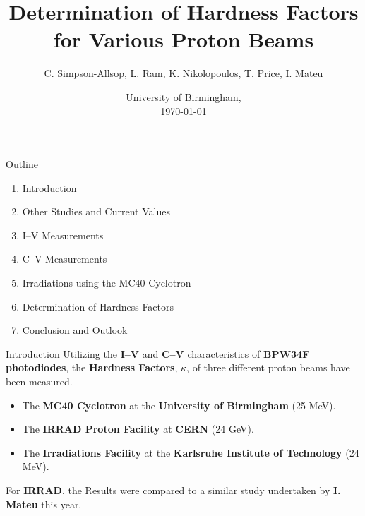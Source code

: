 \documentclass{beamer}
\title{Determination of Hardness Factors for Various Proton Beams}
\author{C. Simpson-Allsop, L. Ram, K. Nikolopoulos, T. Price, I. Mateu \vspace{-1cm}}
\date{University of Birmingham, \\ \vspace{0.1cm} \today}
\begin{document}
\begin{frame}
  \titlepage
\end{frame}

\begin{frame}{Outline}
    \begin{enumerate}
        \item Introduction
        \vspace{0.5cm}
        \item Other Studies and Current Values
        \vspace{0.5cm}
        \item I--V Measurements
        \vspace{0.5cm}
        \item C--V Measurements
        \vspace{0.5cm}
        \item Irradiations using the MC40 Cyclotron
        \vspace{0.5cm}
        \item Determination of Hardness Factors
        \vspace{0.5cm}
        \item Conclusion and Outlook
    \end{enumerate}
\end{frame}

\begin{frame}{Introduction}
 Utilizing the \textbf{I--V} and \textbf{C--V} characteristics of \textbf{BPW34F photodiodes}, the \textbf{Hardness Factors}, $\kappa$, of three different proton beams have been measured.
  \vspace{0.3cm}
  \begin{itemize}
  \item The \textbf{MC40 Cyclotron} at the \textbf{University of Birmingham} (25 MeV).
  \vspace{0.1cm}
  \item The \textbf{IRRAD Proton Facility} at \textbf{CERN} (24 GeV).
  \vspace{0.1cm}
  \item The \textbf{Irradiations Facility} at the \textbf{Karlsruhe Institute of Technology} (24 MeV).
  \end{itemize}
  \vspace{0.3cm}
 For \textbf{IRRAD}, the Results were compared to a similar study undertaken by \textbf{I. Mateu} this year.
\end{frame}
\end{document}
